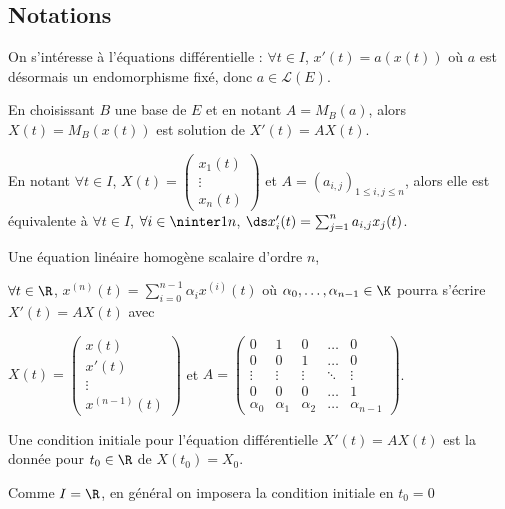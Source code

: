 \subsection{Notations}

On s'intéresse à l'équations différentielle : $\forall t \in I$, $x'(t) = a(x(t))$
où $a$ est désormais un endomorphisme fixé, donc $a \in \mathscr L(E)$.

En choisissant $B$ une base de $E$ et en notant $A = M_B(a)$, 
alors $X(t) = M_B(x(t))$ est solution de $X'(t) = A X(t)$.

En notant $\forall t \in I$, $X(t) = \begin{pmatrix}
    x_1(t) \\ \vdots \\ x_n(t)
\end{pmatrix}$ et $A = (a_{i, j})_{1 \leqslant i, j \leqslant n}$, alors elle est équivalente 
à $\forall t \in I$, $\forall i \in \ninter 1 n$, $\ds x'_i(t) = \sum_{j = 1}^{n} a_{i, j} x_j(t)$.

\begin{remarque}
    Une équation linéaire homogène scalaire d'ordre $n$, 

    $\forall t \in \R$, $x^{(n)}(t) = \sum_{i = 0}^{n - 1} \alpha_i x^{(i)}(t)$ 
    où $\alpha_0, \dots, \alpha_{n - 1} \in \K$ pourra s'écrire 
    $X'(t) = AX(t)$ avec 
    
    $X(t) = \begin{pmatrix}
    x(t) \\ x'(t) \\ \vdots \\ x^{(n - 1)}(t)
    \end{pmatrix}$ et $A = \begin{pmatrix}
    0 & 1 & 0 & \dots & 0 \\
    0 & 0 & 1 & \dots & 0 \\
    \vdots & \vdots & \vdots & \ddots & \vdots \\
    0 & 0 & 0 & \dots & 1 \\
    \alpha_0 & \alpha_1 & \alpha_2 & \dots & \alpha_{n - 1}
    \end{pmatrix}$.
\end{remarque}

\begin{remarque}
    Une condition initiale pour l'équation différentielle $X'(t) = A X(t)$ est 
    la donnée pour $t_0 \in \R$ de $X(t_0) = X_0$. 

    Comme $I = \R$, en général on imposera la condition initiale en $t_0 = 0$
\end{remarque}

